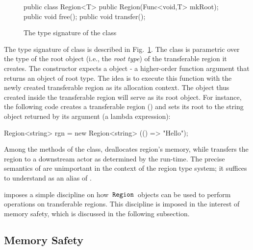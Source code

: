 \begin{figure}
\begin{codejava}
  public class Region<T> {
    public Region(Func<void,T> mkRoot);
    public void free();
    public void transfer();
  }
\end{codejava}
\caption{The type signature of the  class}
\label{fig:region-class}
\end{figure}
The type signature of  class is described in
Fig.~\ref{fig:region-class}. The class is parametric over the type of
the root object (i.e., the \emph{root type}) of the transferable
region it creates. The  constructor expects a 
object - a higher-order function argument that returns an object of
root type.  The idea is to execute this function with the newly
created transferable region as its allocation context. The object thus
created inside the transferable region will serve as its root object.
For instance, the following code creates a transferable region
() and sets its root to the string object returned by its
 argument (a lambda expression):
\begin{codejava}
  Region<string> rgn = new Region<string>
                        (() => "Hello");
\end{codejava}
Among the methods of the  class,  deallocates
region's memory, while  transfers the region to a
downstream actor as determined by the run-time. The precise semantics
of  are unimportant in the context of the region type
system; it suffices to understand  as an alias of
.

\name imposes a simple discipline on how $\,{\tt Region}\,$ objects can be used
to perform operations on transferable regions. This discipline is
imposed in the interest of memory safety, which is discussed in the
following subsection.

\subsection{Memory Safety}
\label{sec:memory-safety}

